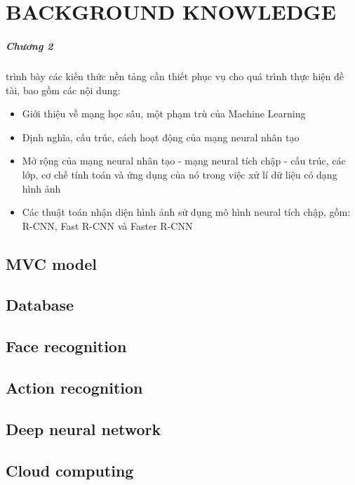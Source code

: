 \chapter{BACKGROUND KNOWLEDGE}
\label{chap:background}
\paragraph{Chương 2} trình bày các kiến thức nền tảng cần thiết phục vụ cho quá trình thực hiện đề tài, bao gồm các nội dung:

\begin{itemize}
\item Giới thiệu về mạng học sâu, một phạm trù của Machine Learning

\item Định nghĩa, cấu trúc, cách hoạt động của mạng neural nhân tạo

\item Mở rộng của mạng neural nhân tạo - mạng neural tích chập - cấu trúc, các lớp, cơ chế tính toán và ứng dụng của nó trong việc xử lí dữ liệu có dạng hình ảnh

\item Các thuật toán nhận diện hình ảnh sử dụng mô hình neural tích chập, gồm: R-CNN, Fast R-CNN và Faster R-CNN
\end{itemize}

\section{MVC model}
\section{Database}
\section{Face recognition}
\section{Action recognition}
\section{Deep neural network}
\section{Cloud computing}
